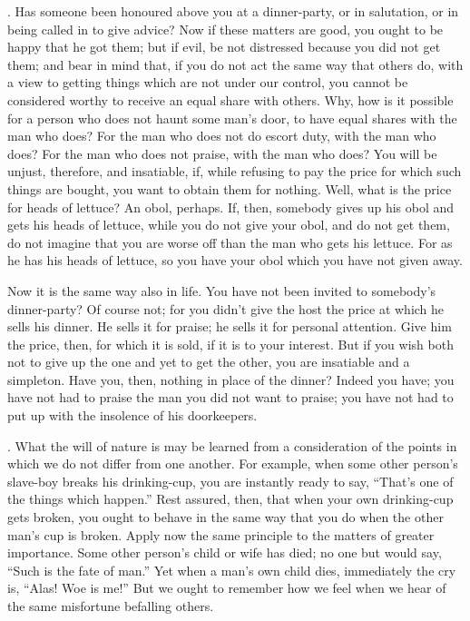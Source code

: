 . Has someone been honoured above you at a dinner-party, or in salutation, or in being called in to give advice? Now if these matters are good, you ought to be happy that he got them; but if evil, be not distressed because you did not get them; and bear in mind that, if you do not act the same way that others do, with a view to getting things which are not under our control, you cannot be considered worthy to receive an equal share with others. Why, how is it possible for a person who does not haunt some man's door, to have equal shares with the man who does? For the man who does not do escort duty, with the man who does? For the man who does not praise, with the man who does? You will be unjust, therefore, and insatiable, if, while refusing to pay the price for which such things are bought, you want to obtain them for nothing. Well, what is the price for heads of lettuce? An obol, perhaps. If, then, somebody gives up his obol and gets his heads of lettuce, while you do not give your obol, and do not get them, do not imagine that you are worse off than the man who gets his lettuce. For as he has his heads of lettuce, so you have your obol which you have not given away.

Now it is the same way also in life. You have not been invited to somebody's dinner-party? Of course not; for you didn't give the host the price at which he sells his dinner. He sells it for praise; he sells it for personal attention. Give him the price, then, for which it is sold, if it is to your interest. But if you wish both not to give up the one and yet to get the other, you are insatiable and a simpleton. Have you, then, nothing in place of the dinner? Indeed you have; you have not had to praise the man you did not want to praise; you have not had to put up with the insolence of his doorkeepers.

. What the will of nature is may be learned from a consideration of the points in which we do not differ from one another. For example, when some other person's slave-boy breaks his drinking-cup, you are instantly ready to say, ``That's one of the things which happen.'' Rest assured, then, that when your own drinking-cup gets broken, you ought to behave in the same way that you do when the other man's cup is broken. Apply now the same principle to the matters of greater importance. Some other person's child or wife has died; no one but would say, ``Such is the fate of man.'' Yet when a man's own child dies, immediately the cry is, ``Alas! Woe is me!'' But we ought to remember how we feel when we hear of the same misfortune befalling others.

